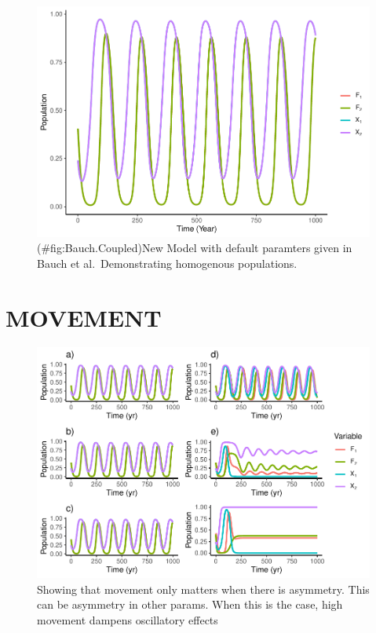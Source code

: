 \documentclass[
]{article}
\begin{document}
\begin{figure}
\centering
\includegraphics{SubmissionFigs_files/figure-latex/Bauch.Coupled-1.pdf}
\caption{(\#fig:Bauch.Coupled)New Model with default paramters given in Bauch et al.~Demonstrating homogenous populations.}
\end{figure}

\hypertarget{movement}{%
\section{MOVEMENT}\label{movement}}

\begin{figure}
\centering
\includegraphics{SubmissionFigs_files/figure-latex/movement-1.pdf}
\caption{\label{fig:movement}Showing that movement only matters when there is asymmetry. This can be asymmetry in other params. When this is the case, high movement dampens oscillatory effects}
\end{figure}
\end{document}
